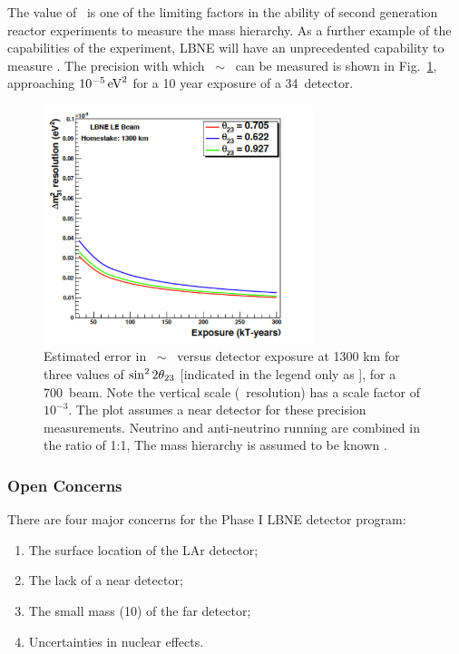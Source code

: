 The value of \deltamtwothree\ is one of the limiting factors in the
ability of second generation reactor experiments to measure the mass
hierarchy. 
As a further example of the
capabilities of the experiment, 
LBNE will have an unprecedented capability to
measure \deltamtwothree. 
The precision with which \deltamthreeone\
$\sim$ \deltamtwothree\ can be measured is shown in
Fig.~\ref{fig:DeltaM31sqMeasumentError}, approaching $10^{-5}\,\mathrm{eV}^2$ for
a 10 year exposure of a 34\kt\ detector. 


\clearpage


\begin{figure}[htbp]
\begin{center}
\includegraphics[width=0.7\textwidth]{RWK/LBNE/DeltaM31sqMeasumentError.pdf}

\caption{ Estimated error in \deltamthreeone\ $\sim$ \deltamtwothree\ versus detector exposure at 1300 km for three values of $\sin^2 2\theta_{23}$ [indicated in the legend only as \thetatwothree], for a 700\kw\ beam. 
Note the vertical scale (\deltamtwothree\  resolution) has a scale factor of $10^{-3}$.
The plot assumes a near detector for these precision measurements. Neutrino and anti-neutrino running are combined in the ratio of 1:1, The mass hierarchy is assumed to be known \cite{PWGReconfigurationReport}.}
\label{fig:DeltaM31sqMeasumentError}
\end{center}
\end{figure}




\subsubsection{Open Concerns}

There are four major concerns for the Phase I LBNE detector program:
\begin{enumerate}
\item {The surface location of the LAr detector;}
\item{The lack of a near detector;}
\item{The small mass (10\kt) of  the far detector;}
\item{Uncertainties in nuclear effects.}
\end{enumerate}

